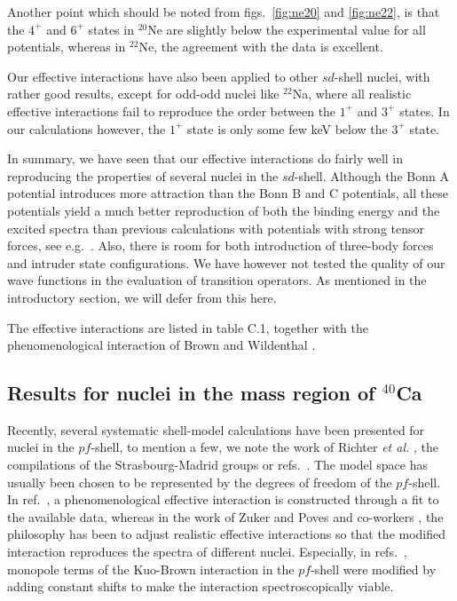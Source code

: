 Another point which should be noted from figs.\ \ref{fig:ne20}
and \ref{fig:ne22}, is that the $4^+$ and $6^+$ states
in $^{20}$Ne are slightly below the experimental value for all potentials,
whereas in $^{22}$Ne, the agreement with the data is excellent.

Our effective interactions have also been applied to other $sd$-shell
nuclei,
with rather good results, except for odd-odd nuclei like $^{22}$Na, where
all realistic effective interactions
fail to reproduce
the order between the $1^+$ and $3^+$ states. In our calculations
however, the $1^+$ state is only some few keV below the $3^+$ state.

In summary, we have seen that our effective interactions do
fairly well in reproducing the properties of several nuclei in the
$sd$-shell. Although the Bonn A potential introduces more attraction
than the Bonn B and C potentials, all these potentials yield a much
better reproduction of both the binding energy and the excited
spectra than previous calculations with potentials with strong
tensor forces, see e.g.\ \cite{skd83}. Also, there is room for
both introduction of three-body forces and intruder state
configurations. We have however not tested the quality of our
wave functions in the evaluation of transition operators.
As mentioned in the introductory section, we will defer from this
here.

The effective interactions are listed in table C.1, together with
the phenomenological 
interaction of Brown and Wildenthal \cite{brown88}.

\subsection{Results for nuclei in the mass region of
$^{40}$Ca}

Recently, several systematic shell-model calculations
have been presented for nuclei in the $pf$-shell, to mention
a few, we note  the work of Richter {\em et al.} \cite{richt91}, the
compilations of the Strasbourg-Madrid groups \cite{pz80,czpm94}
or refs.\ \cite{heho94,heho92}.
The model space has usually been chosen to be represented
by the degrees of freedom of the  $pf$-shell. In ref.\
\cite{richt91}, a phenomenological effective interaction is
constructed through a fit to the available data, whereas in
the work of Zuker and Poves and co-workers \cite{pz80,czpm94},
the philosophy has been to adjust realistic effective interactions
so that the modified interaction reproduces the spectra
of different nuclei. Especially, in refs.\ \cite{pz80,czpm94},
monopole terms of the Kuo-Brown interaction in the
$pf$-shell were modified by adding constant shifts to make
the interaction spectroscopically viable.

